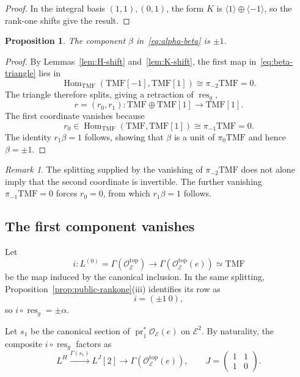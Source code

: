 \documentclass[11pt,a4paper]{amsart}
\newcommand{\TMF}{\mathrm{TMF}}
\newcommand{\cE}{\mathcal E}
\newcommand{\cO}{\mathcal O}
\newcommand{\Hom}{\operatorname{Hom}}
\newcommand{\res}{\operatorname{res}}
\theoremstyle{plain}
\newtheorem{proposition}[theorem]{Proposition}
\theoremstyle{definition}
\theoremstyle{remark}
\newtheorem{remark}[theorem]{Remark}
\begin{document}
\begin{proof}
In the integral basis $(1,1),(0,1)$, the form $K$ is
$\langle1\rangle\oplus\langle-1\rangle$, so the rank-one shifts
give the result.
\end{proof}

\begin{proposition}\label{prop:beta-unit}
The component $\beta$ in~\eqref{eq:alpha-beta} is $\pm1$.
\end{proposition}

\begin{proof}
By Lemmas~\ref{lem:H-shift} and~\ref{lem:K-shift}, the first
map in~\eqref{eq:beta-triangle} lies in
\[
 \Hom_{\TMF}(\TMF[-1],\TMF[1])
 \cong\pi_{-2}\TMF=0.
\]
The triangle therefore splits, giving a retraction of $\res_g$,
\[
 r=(r_0,r_1):\TMF\oplus\TMF[1]\longrightarrow\TMF[1].
\]
The first coordinate vanishes because
\[
 r_0\in\Hom_{\TMF}(\TMF,\TMF[1])
 \cong\pi_{-1}\TMF=0.
\]
The identity $r_1\beta=1$ follows, showing that $\beta$ is a
unit of $\pi_0\TMF$ and hence $\beta=\pm1$.
\end{proof}

\begin{remark}
The splitting supplied by the vanishing of $\pi_{-2}\TMF$ does
not alone imply that the second coordinate is invertible.
The further vanishing $\pi_{-1}\TMF=0$ forces $r_0=0$, from
which $r_1\beta=1$ follows.
\end{remark}

\subsection{The first component vanishes}

Let
\[
 i:L^{(0)}=\Gamma(\cO_{\cE}^{\mathrm{top}})
 \longrightarrow
 \Gamma(\cO_{\cE}^{\mathrm{top}}(e))\simeq\TMF
\]
be the map induced by the canonical inclusion. In the same
splitting, Proposition~\ref{prop:public-rankone}(iii) identifies
its row as
\begin{equation}\label{eq:i-row}
 i=(\pm1\ 0),
\end{equation}
so $i\circ\res_g=\pm\alpha$.

Let $s_1$ be the canonical section of
$\operatorname{pr}_1^*\cO_{\cE}(e)$ on $\cE^2$.
By naturality, the composite $i\circ\res_g$ factors as
\begin{equation}\label{eq:alpha-factor}
 L^H\xrightarrow{\Gamma(s_1)}L^J[2]
 \longrightarrow\Gamma(\cO_{\cE}^{\mathrm{top}}(e)),
 \qquad
 J=\begin{pmatrix}1&1\\1&0\end{pmatrix}.
\end{equation}
\end{document}
